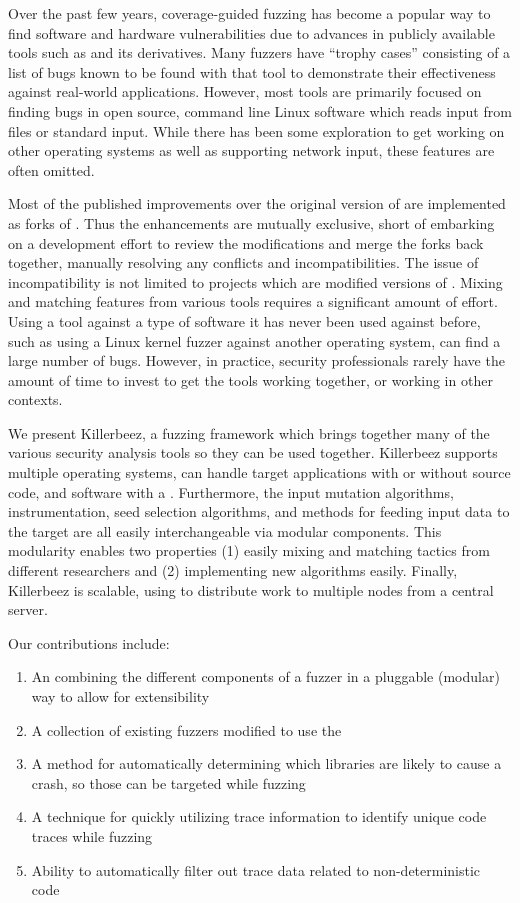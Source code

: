Over the past few years, coverage-guided fuzzing has become a popular way to
find software and hardware vulnerabilities due to advances in publicly
available tools such as \AFL{}\cite{afl} and its derivatives.\cite{vanhauser} Many
fuzzers have ``trophy cases'' consisting of a list of bugs known to be found with that tool to
demonstrate their effectiveness against real-world applications.  However, most
tools are primarily focused on finding bugs in open source, command line Linux
software which reads input from files or standard input. While there has been some
exploration to get \AFL{} working on other operating
systems\cite{aflosx,winafl} as well as supporting network
input,\cite{netafl,preeny} these features are often omitted.

Most of the published improvements over the original version of \AFL{} are
implemented as forks of
\AFL{}.\cite{aflfast,aflgo,fairfuzz,perffuzz,pythia,collafl}
Thus the enhancements are mutually exclusive, short of embarking on a
development effort to review the modifications and merge the forks back
together, manually resolving any conflicts and incompatibilities.  The issue
of incompatibility is not limited to projects which are modified versions of
\AFL{}. Mixing and matching features from various tools requires a significant
amount of effort. Using a tool against a type of software it has never been
used against before, such as using a Linux kernel fuzzer against another
operating system, can find a large number of bugs\cite{anton}.  However, in practice, security
professionals rarely have the amount of time to invest to get the tools working
together, or working in other contexts.

We present Killerbeez, a fuzzing framework which brings together many of the
various security analysis tools so they can be used together.  Killerbeez
supports multiple operating systems, can handle target applications with or
without source code, and software with a \GUI{}.
Furthermore, the input mutation algorithms, instrumentation, seed selection
algorithms, and methods for feeding input data to the target are all easily
interchangeable via modular components.  This modularity enables two
properties (1) easily mixing and matching
tactics from different researchers and (2) implementing new algorithms easily.
Finally, Killerbeez is scalable, using \BOINC{}\cite{boinc} to distribute work
to multiple nodes from a central server.

Our contributions include:
\begin{enumerate}[noitemsep]
\item An \API{} combining the different components of a fuzzer in a pluggable (modular) way to allow for extensibility
\item A collection of existing fuzzers modified to use the \API{}
\item A method for automatically determining which libraries are likely to
	cause a crash, so those can be targeted while fuzzing
\item A technique for quickly utilizing \IPT{} trace information to identify unique code traces while fuzzing
\item Ability to automatically filter out trace data related to non-deterministic code
\end{enumerate}
